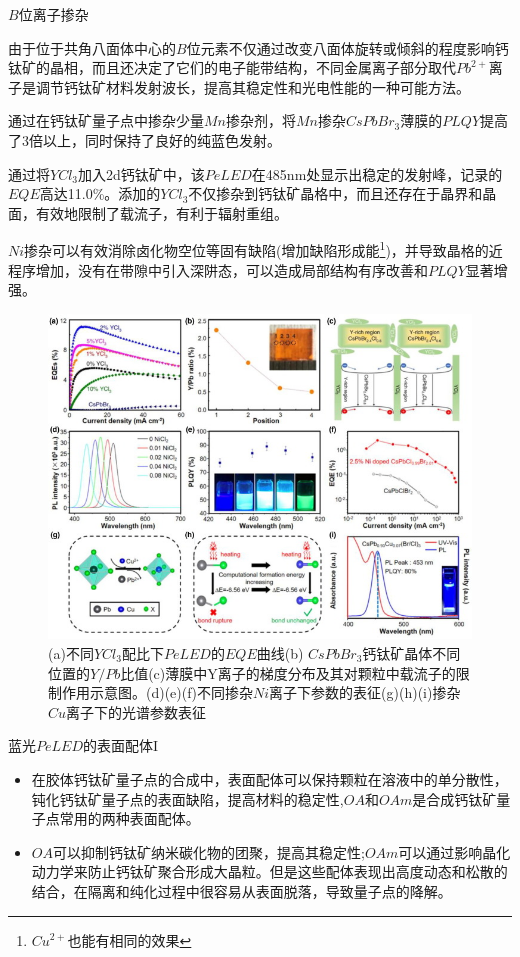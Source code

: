\documentclass{beamer}[fontset=windows]
\begin{document}
\begin{frame}
\begin{block}{$B$位离子掺杂}
\begin{itemize}\small{
\item 由于位于共角八面体中心的$B$位元素不仅通过改变八面体旋转或倾斜的程度影响钙钛矿的晶相，而且还决定了它们的电子能带结构，不同金属离子部分取代$Pb^{2+}$离子是调节钙钛矿材料发射波长，提高其稳定性和光电性能的一种可能方法。
\item 通过在钙钛矿量子点中掺杂少量$Mn$掺杂剂，将$Mn$掺杂$CsPbBr_{3}$薄膜的$PLQY$提高了3倍以上，同时保持了良好的纯蓝色发射。
\item 通过将$YCl_{3}$加入2d钙钛矿中，该$PeLED$在485nm处显示出稳定的发射峰，记录的$EQE$高达11.0\%。添加的$YCl_{3}$不仅掺杂到钙钛矿晶格中，而且还存在于晶界和晶面，有效地限制了载流子，有利于辐射重组。
\item $Ni$掺杂可以有效消除卤化物空位等固有缺陷(增加缺陷形成能\footnote{$Cu^{2+}$也能有相同的效果})，并导致晶格的近程序增加，没有在带隙中引入深阱态，可以造成局部结构有序改善和$PLQY$显著增强。}
\end{itemize}
\end{block}
\end{frame}
\begin{frame}
	\begin{figure}[H]
		\centering
		\hspace{2em}\includegraphics[width=.65\linewidth]{pic/9.jpg}
		\caption{(a)不同$YCl_{3}$配比下$PeLED$的$EQE$曲线(b) $CsPbBr_{3}$钙钛矿晶体不同位置的$Y/Pb$比值(c)薄膜中Y离子的梯度分布及其对颗粒中载流子的限制作用示意图。(d)(e)(f)不同掺杂$Ni$离子下参数的表征(g)(h)(i)掺杂$Cu$离子下的光谱参数表征
        \cite{zhang2021blue}
		}
	\end{figure}
\end{frame}
\begin{frame}
\begin{block}{蓝光$PeLED$的表面配体I}
\begin{itemize}
\item 在胶体钙钛矿量子点的合成中，表面配体可以保持颗粒在溶液中的单分散性，钝化钙钛矿量子点的表面缺陷，提高材料的稳定性,$OA$和$OAm$是合成钙钛矿量子点常用的两种表面配体。
\item $OA$可以抑制钙钛矿纳米碳化物的团聚，提高其稳定性;$OAm$可以通过影响晶化动力学来防止钙钛矿聚合形成大晶粒。但是这些配体表现出高度动态和松散的结合，在隔离和纯化过程中很容易从表面脱落，导致量子点的降解。
\end{itemize}
\end{block}
\end{frame}
\end{document}
